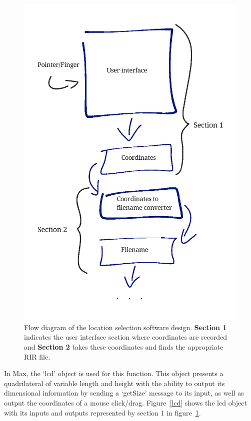 \documentclass[../../main.tex]{subfiles}
\begin{document}
			\begin{figure}[H]
				\centerline{\includegraphics[scale = 0.3]{Sections/Implementation/Max/images/FlowDiagrams/Max1_V2.png}}
				\caption{Flow diagram of the location selection software design. \textbf{Section 1} indicates the user interface section where coordinates are recorded and \textbf{Section 2} takes these coordinates and finds the appropriate \ac{RIR} file.}
				\label{flowDiagram}
			\end{figure}

			In Max, the ‘lcd’ object is used for this function. This object presents a quadrilateral of variable length and height with the ability to output its dimensional information by sending a ‘getSize’ message to its input, as well as output the coordinates of a mouse click/drag. Figure~\ref{lcd} shows the lcd object with its inputs and outputs represented by section 1 in figure~\ref{flowDiagram}.
\end{document}
